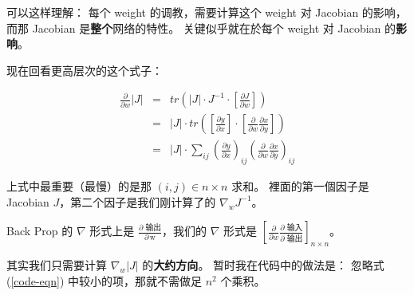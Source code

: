 \documentclass[orivec]{llncs}
\makeatletter
\newcommand{\cc}[2]{#1}
\newcommand{\cc}[2]{#2}
\renewcommand{\boxed}[1]{\fbox{\m@th$\displaystyle\scalebox{0.9}{#1}$} \,}
\makeatother
\begin{document}
\cc{
可以这样理解： 每个 weight 的调教，需要计算这个 weight 对 Jacobian 的影响，而那 Jacobian 是\textbf{整个}网络的特性。 关键似乎就在於每个 weight 对 Jacobian 的\textbf{影响}。 
}{
We can understand it thusly:  For each weight we try to calculate its influence towards the Jacobian, but the Jacobian is a \textbf{global} property of the network.  The key seems to lie in how each weight \textbf{influences} the Jacobian.
}

\cc{
现在回看更高层次的这个式子：
}{
Now let's look back at this higher-level formula:
}
\begin{eqnarray}
\frac{\partial}{\partial w} |J| &=& tr ( |J| \cdot J^{-1} \cdot \left[ \frac{\partial J}{\partial w} \right] ) \\
&=& |J| \cdot tr ( \left[ \frac{\partial y}{\partial x} \right] \cdot \left[ \frac{\partial }{\partial w} \frac{\partial x}{\partial y} \right] ) \\
&=& |J| \cdot \sum_{i j} \left( \frac{\partial y}{\partial x} \right)_{i j} \left( \frac{\partial }{\partial w} \frac{\partial x}{\partial y} \right)_{i j}
\label{code-eqn}
\end{eqnarray}

\cc{
上式中最重要（最慢）的是那 $(i, j) \in n \times n$ 求和。 裡面的第一個因子是 Jacobian $J$，第二个因子是我们刚计算了的 $\nabla_w J^{-1}$。 
}{
The most critical (slowest) part is the $(i, j) \in n \times n$ summation.  The first factor inside $\sum$ is the Jacobian $J$, the second factor is the $\nabla_w J^{-1}$ that we just calculated. 
}


\cc{
Back Prop 的 $\nabla$ 形式上是 $\displaystyle \frac{\partial \mbox{ 输出}}{\partial \, \mbox{w}}$，我们的 $\nabla$ 形式是 $\displaystyle \left[ \frac{\partial}{\partial w} \frac{\partial \mbox{ 输入}}{\partial \mbox{ 输出}} \right]_{n \times n}$。
}{
Back Prop's $\nabla$ has the form $\displaystyle \frac{\partial \, \boxed{\mbox{output}}}{\partial \, \boxed{\mbox{weights}}}$\\
whereas our $\nabla$ has the form $\displaystyle \left[ \frac{\partial}{\partial \, \boxed{\mbox{weights}}} \frac{\partial \, \boxed{\mbox{input}}}{\partial \, \boxed{\mbox{output}}} \right]_{n \times n}$.
}

\cc{
其实我们只需要计算 $\nabla_w |J|$ 的\textbf{大约方向}。 暂时我在代码中的做法是： 忽略式 (\ref{code-eqn}) 中较小的项，那就不需做足 $n^2$ 个乘积。 
}{
In fact we just need to calculate the \textbf{approximate} direction and size of $\nabla_w |J|$.  Currently in our code we use this trick:  ignore the smaller terms in (\ref{code-eqn2}), so we don't need to do all of $n^2$ products. 
}
\end{document}
